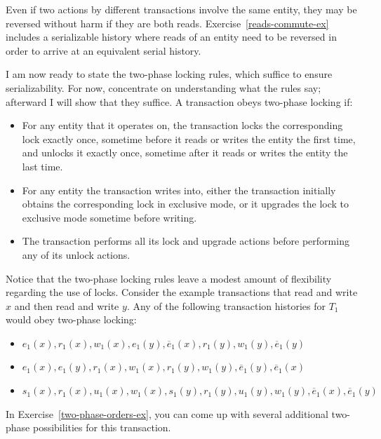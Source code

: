 Even if two actions by different transactions involve
the same entity, they may be reversed without harm if they are both reads.
Exercise~\ref{reads-commute-ex} includes a serializable
history where reads of an entity need to be reversed in order to
arrive at an equivalent serial history.

I am now ready to state the two-phase locking rules, which suffice
to ensure serializability.  For now, concentrate on understanding what
the rules say; afterward I will show that they suffice.  A
transaction obeys two-phase locking if:
\begin{itemize}
\item
For any entity that it operates on, the transaction locks the
corresponding lock exactly once, sometime before it reads or writes
the entity the first time, and unlocks it exactly once, sometime after
it reads or writes the entity the last time.
\item
For any entity the transaction writes into, either the
transaction initially obtains the corresponding lock in exclusive mode,
or it upgrades the lock to exclusive mode sometime before writing.
\item
The transaction performs all its lock and upgrade actions before performing any of
its unlock actions.
\end{itemize}

Notice that the two-phase locking rules leave a modest amount of
flexibility regarding the use of locks.  Consider the
example transactions that read and write $x$ and then read and write
$y$.  Any of the following transaction histories for $T_1$ would obey
two-phase locking:
\begin{itemize}
\item \label{two-phase-examples}$e_1(x), r_1(x), w_1(x), e_1(y), \overline{e}_1(x), r_1(y), w_1(y),
\overline{e}_1(y)$
\item $e_1(x), e_1(y), r_1(x), w_1(x), r_1(y), w_1(y),
\overline{e}_1(y), \overline{e}_1(x)$
\item $s_1(x), r_1(x), u_1(x), w_1(x), s_1(y), r_1(y), u_1(y),
w_1(y), \overline{e}_1(x), \overline{e}_1(y)$
\end{itemize}
In Exercise~\ref{two-phase-orders-ex}, you can come up with several additional two-phase
possibilities for this transaction.

